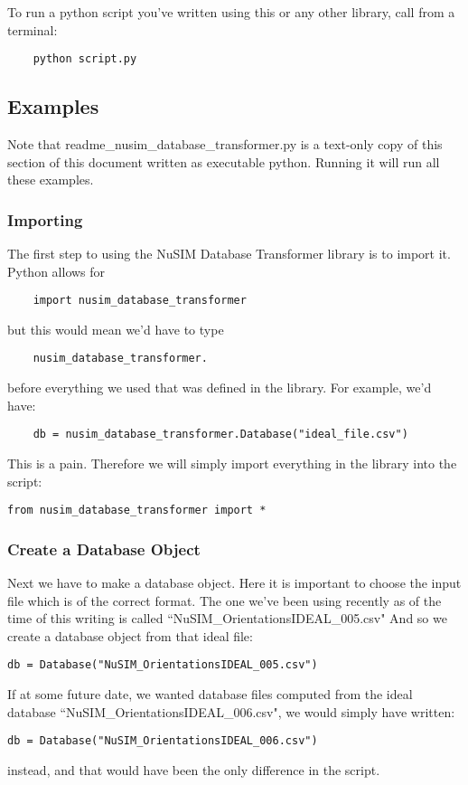 	To run a python script you've written using this or any other library,
call from a terminal:
\begin{verbatim}
	python script.py
\end{verbatim}

\subsection{Examples}
	Note that readme\_nusim\_database\_transformer.py is a text-only copy of this section of this document written as executable python. Running it will run all these examples. 



\subsubsection{Importing}
	The first step to using the NuSIM Database Transformer library is 
to import it. Python allows for 
\begin{verbatim}
	import nusim_database_transformer
\end{verbatim}
but this would mean we'd have to type
\begin{verbatim}
	nusim_database_transformer.
\end{verbatim}
before everything we used that was defined in the library. For example, 
we'd have:
\begin{verbatim}
	db = nusim_database_transformer.Database("ideal_file.csv")
\end{verbatim}
This is a pain. Therefore we will simply import everything in the library 
into the script:
\begin{verbatim}
from nusim_database_transformer import *
\end{verbatim}

\subsubsection{Create a Database Object}
Next we have to make a database object. Here it is important to choose the 
input file which is of the correct format. The one we've been using 
recently as of the time of this writing is called ``NuSIM\_OrientationsIDEAL\_005.csv"
And so we create a database object from that ideal file:
\begin{verbatim}
db = Database("NuSIM_OrientationsIDEAL_005.csv")
\end{verbatim}
If at some future date, we wanted database files computed from the ideal 
database ``NuSIM\_OrientationsIDEAL\_006.csv", we would simply have written:
\begin{verbatim}
db = Database("NuSIM_OrientationsIDEAL_006.csv")
\end{verbatim}
instead, and that would have been the only difference in the script. 


